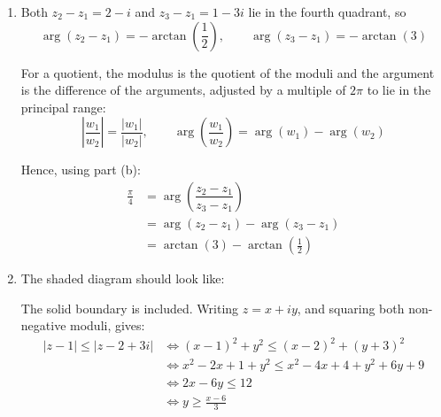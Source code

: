 \documentclass[leqno]{article}
\begin{document}
\begin{enumerate}[
  label=\textbf{\arabic*.},
  leftmargin=*,
  topsep=0pt,
  partopsep=0pt,
  parsep=0pt
]
\begin{djsSolution}
\begin{enumerate}[label=\textbf{(\alph*)}, start=1]
\(\frac12+\frac12i\) lies in the first quadrant, so
\[
\arg\left(\frac{z_2-z_1}{z_3-z_1}\right)=\arctan(1)=\frac{\pi}{4}
\]

\item Both \(z_2-z_1=2-i\) and \(z_3-z_1=1-3i\) lie in the fourth quadrant, so
\[
\arg(z_2-z_1)=-\arctan\left(\frac12\right),\qquad
\arg(z_3-z_1)=-\arctan(3)
\]

For a quotient, the modulus is the quotient of the moduli and the argument is the difference of the arguments, adjusted by a multiple of \(2\pi\) to lie in the principal range:
\[
\left|\dfrac{w_1}{w_2}\right|=\dfrac{|w_1|}{|w_2|},\qquad \arg\left(\dfrac{w_1}{w_2}\right)=\arg(w_1)-\arg(w_2)
\]

Hence, using part (b):
\begin{align*}
\frac{\pi}{4}
&=\arg\left(\dfrac{z_2-z_1}{z_3-z_1}\right)\\
&=\arg(z_2-z_1)-\arg(z_3-z_1)\\
&=\arctan(3)-\arctan\left(\frac12\right)
\end{align*}

\item The shaded diagram should look like:\par\nopagebreak


The solid boundary is included. Writing \(z=x+iy\), and squaring both non-negative moduli, gives:
\begin{align*}
|z-1|\leq |z-2+3i|
&\iff (x-1)^2+y^2\leq (x-2)^2+(y+3)^2\\
&\iff x^2-2x+1+y^2\leq x^2-4x+4+y^2+6y+9\\
&\iff 2x-6y\leq 12\\
&\iff y\geq \frac{x-6}{3}
\end{align*}


\end{enumerate}
\end{djsSolution}
\end{enumerate}
\end{document}
